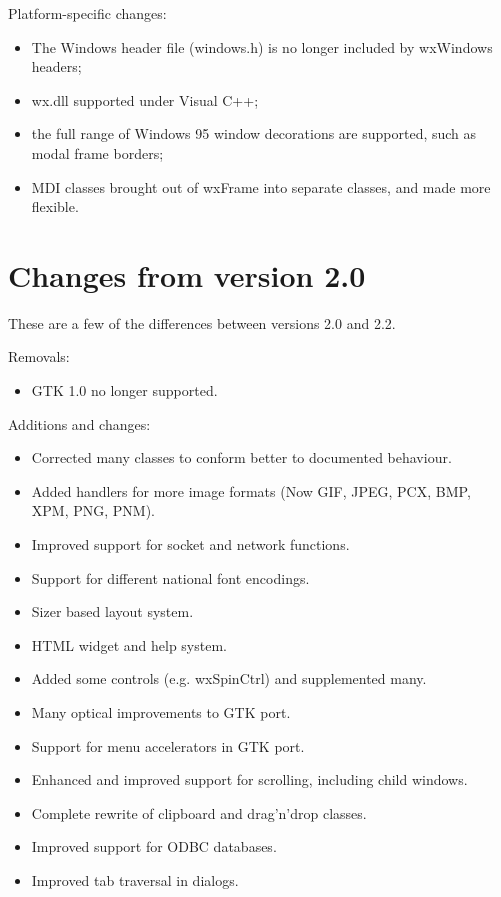 Platform-specific changes:

\begin{itemize}\itemsep=0pt
\item The Windows header file (windows.h) is no longer included by wxWindows headers;
\item wx.dll supported under Visual C++;
\item the full range of Windows 95 window decorations are supported, such as modal frame
borders;
\item MDI classes brought out of wxFrame into separate classes, and made more flexible.
\end{itemize}


\section{Changes from version 2.0}\label{versionchanges20}

These are a few of the differences between versions 2.0 and 2.2.

Removals:

\begin{itemize}\itemsep=0pt
\item GTK 1.0 no longer supported.
\end{itemize}

Additions and changes:

\begin{itemize}\itemsep=0pt
\item Corrected many classes to conform better to documented behaviour.
\item Added handlers for more image formats (Now GIF, JPEG, PCX, BMP, XPM, PNG, PNM).
\item Improved support for socket and network functions.
\item Support for different national font encodings.
\item Sizer based layout system.
\item HTML widget and help system.
\item Added some controls (e.g. wxSpinCtrl) and supplemented many.
\item Many optical improvements to GTK port.
\item Support for menu accelerators in GTK port.
\item Enhanced and improved support for scrolling, including child windows.
\item Complete rewrite of clipboard and drag'n'drop classes.
\item Improved support for ODBC databases.
\item Improved tab traversal in dialogs.
\end{itemize}


